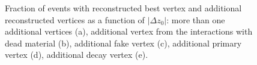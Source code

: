 \begin{figure}[H]
{			\begin{subfigure}[b]{\linewidth}{
					}
			\end{subfigure}
		}
	\caption[Fraction of events with reconstructed best vertex and additional reconstructed vertices  as a function of $|\Delta z_0|$]{Fraction of events with reconstructed best vertex and additional reconstructed vertices as a function of $|\Delta z_0|$: more than one additional vertices (a), additional vertex from the interactions with dead material (b), additional fake vertex (c), additional primary vertex (d), additional decay vertex (e).}
	\label{fig:vertexAdditionalZ}
\end{figure}